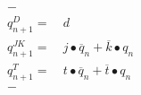 \begin{align*}-&~\\  q_{n+1}^{D}=&~d\\
    q_{n+1}^{JK}=&~ j\bullet\overline{q}_{n} + \overline{k}\bullet q_n\\
    q_{n+1}^{T}=&~t\bullet \overline{q}_{n} + \overline{t}\bullet q_n\\
-&~\\\end{align*}